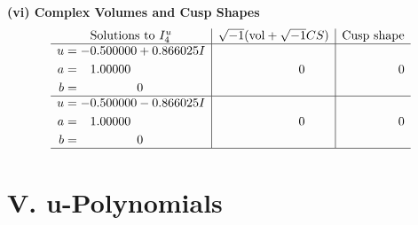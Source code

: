 \documentclass[1p]{elsarticle_modified}
\theoremstyle{definition}
\newcommand{\I}{\sqrt{-1}}
\begin{document}
\newpage\flushleft \textbf{(vi) Complex Volumes and Cusp Shapes}
$$\begin{array}{c|c|c}  
\text{Solutions to }I^u_{4}& \I (\text{vol} + \sqrt{-1}CS) & \text{Cusp shape}\\
 \hline 
\begin{aligned}
u &= -0.500000 + 0.866025 I \\
a &= \phantom{-}1.00000\phantom{ +0.000000I} \\
b &= \phantom{-0.000000 } 0\end{aligned}
 & \phantom{-0.000000 } 0 & \phantom{-0.000000 } 0 \\ \hline\begin{aligned}
u &= -0.500000 - 0.866025 I \\
a &= \phantom{-}1.00000\phantom{ +0.000000I} \\
b &= \phantom{-0.000000 } 0\end{aligned}
 & \phantom{-0.000000 } 0 & \phantom{-0.000000 } 0\\
 \hline 
 \end{array}$$\newpage
\newpage\renewcommand{\arraystretch}{1}
\centering \section*{ V. u-Polynomials}
\end{document}
